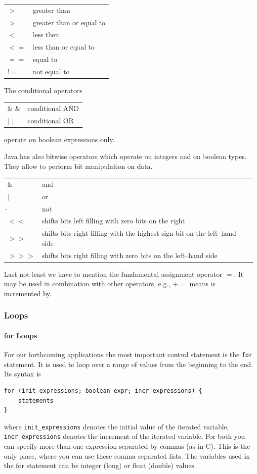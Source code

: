 \begin{center}
\begin{tabular}{ll}
$>$  & greater than \\
$>=$ & greater than or equal to \\
$<$  & less then \\
$<=$ & less than or equal to \\
$==$ & equal to \\
$!=$ & not equal to
\end{tabular}
\end{center}


The conditional operators
\begin{center}
\begin{tabular}{ll}
\& \& & conditional AND      \\
$\mid\mid$ & conditional OR
\end{tabular}
\end{center}
operate on  boolean expressions only.

Java has also bitwise operators which operate on integers and on
boolean types. They allow to perform bit manipulation on data.
\begin{center}
\begin{tabular}{ll}
\& & and \\
$\mid$ & or \\
$\tilde{}$ & not \\
$<<$ &  shifts bits left filling with zero bits on the right \\
$>>$ & shifts bits right filling with the highest sign bit on the
           left--hand side \\
$ >>>$ & shifts bits right filling with zero bits on the left--hand side 
\end{tabular}
\end{center}

Last not least we have to mention the fundamental assignment operator
$=$. It may be used in combination with other operators, e.g., $+=$
means is incremented by.


\subsubsection{Loops}
\paragraph{for Loops}
For our forthcoming applications the most important control statement
is the \verb|for| statement. It is used to loop over a range of values
from the beginning to the end. Its syntax is
\begin{verbatim}
for (init_expressions; boolean_expr; incr_expressions) {
    statements
}
\end{verbatim}
where \verb|init_expressions| denotes the initial value of the iterated
variable, \verb|incr_expressions| denotes the increment of the iterated
variable. For both you can specify more than one expression separated
by commas (as in C). This is the only place, where you can use these comma
separated lists. The variables used in the for statement can be 
integer (long) or float (double) values. 

